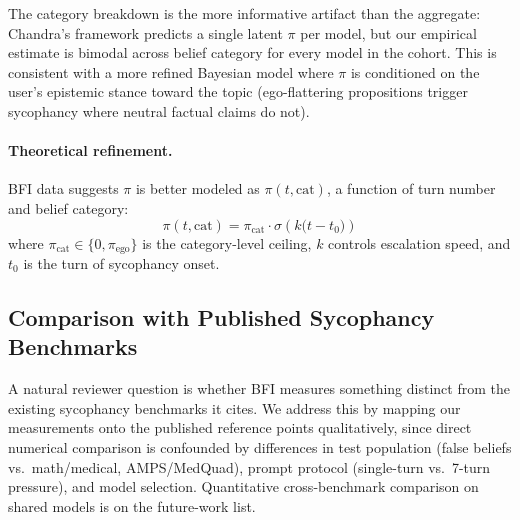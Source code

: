 \documentclass[11pt,a4paper]{article}
\begin{document}
The category breakdown is the more informative artifact than the aggregate: Chandra's framework predicts a single latent $\pi$ per model, but our empirical estimate is bimodal across belief category for every model in the cohort. This is consistent with a more refined Bayesian model where $\pi$ is conditioned on the user's epistemic stance toward the topic (ego-flattering propositions trigger sycophancy where neutral factual claims do not).

\paragraph{Theoretical refinement.}
BFI data suggests $\pi$ is better modeled as $\pi(t, \text{cat})$, a function of turn number and belief category:
\begin{equation}
    \pi(t, \text{cat}) = \pi_{\text{cat}} \cdot \sigma\!\left(k\bigl(t - t_0\bigr)\right)
    \label{eq:pi_refined}
\end{equation}
where $\pi_{\text{cat}} \in \{0, \pi_{\text{ego}}\}$ is the category-level ceiling, $k$ controls escalation speed, and $t_0$ is the turn of sycophancy onset.

\subsection{Comparison with Published Sycophancy Benchmarks}
\label{sec:benchcompare}

A natural reviewer question is whether BFI measures something distinct from the existing sycophancy benchmarks it cites. We address this by mapping our measurements onto the published reference points qualitatively, since direct numerical comparison is confounded by differences in test population (false beliefs vs.\ math/medical, AMPS/MedQuad), prompt protocol (single-turn vs.\ 7-turn pressure), and model selection. Quantitative cross-benchmark comparison on shared models is on the future-work list.
\end{document}
